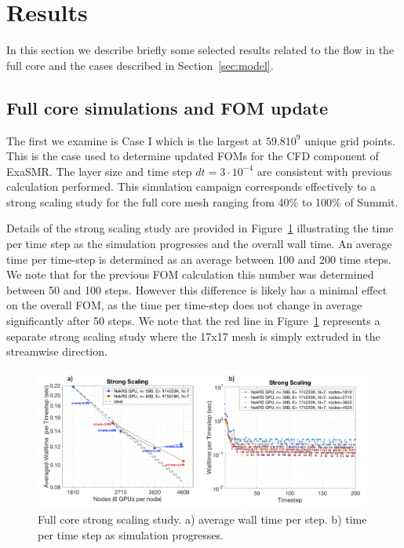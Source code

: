 \section{Results}
\label{sec:results}

In this section we describe briefly some selected results related to the flow in the full core and the cases described in Section~\ref{sec:model}.

\subsection{Full core simulations and FOM update}
\label{sec:results1}

The first we examine is Case I which is the largest at $59.8 10^{9}$ unique grid points. This is the case used to determine updated FOMs for the CFD component of ExaSMR. The layer size and time step $dt=3 \cdot 10^{-4}$ are consistent with previous calculation performed.  This simulation campaign corresponds effectively to a strong scaling study for the full core mesh ranging from 40\% to 100\% of Summit.

Details of the strong scaling study are provided in Figure~\ref{fig:strong} illustrating the time per time step as the simulation progresses and the overall wall time. An average time per time-step is determined as an average between 100 and 200 time steps. We note that for the previous FOM calculation this number was determined between 50 and 100 steps. However this difference is likely has a  minimal effect on the overall FOM, as the time per time-step does not change in average significantly after 50 steps. We note that the red line in Figure~\ref{fig:strong}  represents a separate strong scaling study where the 17x17 mesh is simply extruded in the streamwise direction.

\begin{figure}[!ht]
\centering
\includegraphics[width=0.99\textwidth]{./figures/full_core_strong.png}
\caption{Full core strong scaling study. a) average wall time per step. b) time per time step as simulation progresses. }
\label{fig:strong}
\end{figure}

